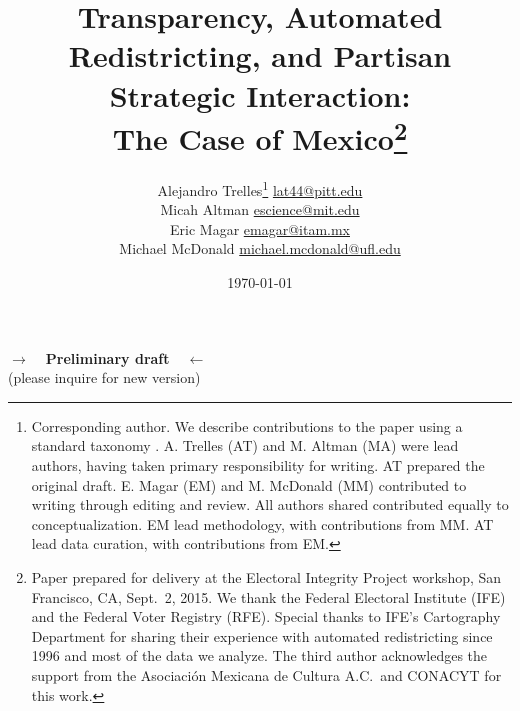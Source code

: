 \documentclass[letter,12pt]{article}
\begin{document}
\title{Transparency, Automated Redistricting, and Partisan Strategic Interaction: \\ 
       The Case of Mexico\thanks{Paper prepared for delivery at the Electoral Integrity Project workshop, San Francisco, CA, Sept.~2, 2015. We thank the Federal Electoral Institute (IFE) and the Federal Voter Registry (RFE). Special thanks to IFE's Cartography Department for sharing their experience with automated redistricting since 1996 and most of the data we analyze. The third author acknowledges the support from the Asociaci\'on Mexicana de Cultura A.C.\ and CONACYT for this work.}}

\author {Alejandro Trelles\footnote{Corresponding author. We describe contributions to the paper using a standard taxonomy \citet{allen2014credit}. A. Trelles (AT) and M. Altman (MA) were lead authors, having taken primary responsibility for writing.  AT prepared the original draft.  E. Magar (EM) and M. McDonald (MM) contributed to writing through editing and review. All authors shared contributed equally to conceptualization. EM lead methodology, with contributions from MM. AT lead data curation, with contributions from EM.} {\small \url{lat44@pitt.edu}}\\
        Micah Altman {\small \url{escience@mit.edu}} \\
        Eric Magar {\small \url{emagar@itam.mx}} \\  
        Michael McDonald {\small \url{michael.mcdonald@ufl.edu}}
      }
      

\date{\today}
\maketitle


\begin{center} \textbf{$\rightarrow$~~Preliminary draft~~$\leftarrow$} \\ (please inquire for new version) \end{center}
\end{document}
